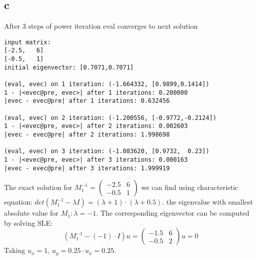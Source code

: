 \subsection*{c}
After 3 steps of power iteration eval converges to next solution
\begin{verbatim}
input matrix:
[-2.5,   6]
[-0.5,   1]
initial eigenvector: [0.7071,0.7071]

(eval, evec) on 1 iteration: (-1.664332, [0.9899,0.1414])
1 - |<evec@pre, evec>| after 1 iterations: 0.200000
|evec - evec@pre| after 1 iterations: 0.632456

(eval, evec) on 2 iteration: (-1.200556, [-0.9772,-0.2124])
1 - |<evec@pre, evec>| after 2 iterations: 0.002603
|evec - evec@pre| after 2 iterations: 1.998698

(eval, evec) on 3 iteration: (-1.083620, [0.9732,  0.23])
1 - |<evec@pre, evec>| after 3 iterations: 0.000163
|evec - evec@pre| after 3 iterations: 1.999919
\end{verbatim}
The exact solution for $M_1^{-1} = 
\begin{pmatrix}
	-2.5 & 6\\
	-0.5 & 1
\end{pmatrix}
$ we can find using characteristic equation: $det(M_1^{-1} - \lambda I) = (\lambda + 1)\cdot (\lambda + 0.5)$.
the eigenvalue with smallest absolute value for $M_1: \lambda = -1$. The corresponding eigenvector can be computed by solving SLE:
\begin{equation}
		(M_1^{-1} - (-1)\cdot I)u = 
		\begin{pmatrix}
			-1.5 & 6\\
			-0.5 & 2
		\end{pmatrix}
		u = 0
\end{equation}
Taking $u_x = 1$, $u_y = 0.25\cdot u_x = 0.25$.

